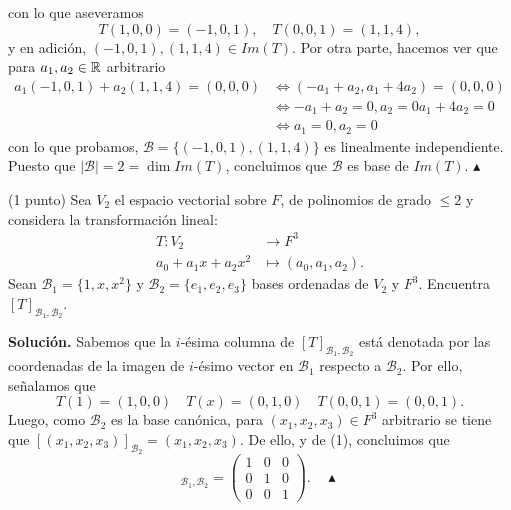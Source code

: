 \documentclass[11pt]{scrartcl}
\begin{document}
con lo que aseveramos
\begin{equation*}
    T(1,0,0)=(-1,0,1), \quad T(0,0,1)=(1,1,4),
\end{equation*}
y en adición, $(-1,0,1),(1,1,4) \in Im(T)$. Por otra parte, hacemos ver que para $a_1,a_2 \in \mathbb R$ arbitrario
\begin{align*}
    a_1(-1,0,1) + a_2(1,1,4) = (0,0,0) &\iff (-a_1+a_2,a_1+4a_2) = (0,0,0) \\
    &\iff -a_1+a_2=0, a_2=0 a_1+4a_2=0 \\
    &\iff a_1=0, a_2=0
\end{align*}
con lo que probamos, $\mathcal{B}=\{(-1,0,1),(1,1,4)\}$ es linealmente independiente. Puesto que $|\mathcal{B}|=2=\dim Im(T)$,
concluimos que $\mathcal{B}$ es base de $Im(T)$. $\blacktriangle$

\newpage
\begin{mdframed}[style=mdpurplebox, frametitle={Ejercicio 2, Tarea 11, Álgebra Lineal I}]
    (1 punto) Sea $V_2$ el espacio vectorial sobre $F$, de polinomios de grado $\leq 2$ y considera la transformación lineal:
    \begin{align*}
        T:V_2 &\rightarrow F^3 \\
        a_0+a_1x+a_2x^2 &\mapsto (a_0,a_1,a_2).
    \end{align*}
    Sean $\mathcal{B}_1 = \{1,x,x^2\}$ y $\mathcal{B}_2 = \{e_1,e_2,e_3\}$ bases ordenadas de $V_2$ y $F^3$. Encuentra $[T]_{\mathcal{B}_1,\mathcal{B}_2}$.
\end{mdframed}
\textbf{Solución.} Sabemos que la $i$-ésima columna de $[T]_{\mathcal{B}_1,\mathcal{B}_2}$ está denotada por las coordenadas de la imagen de $i$-ésimo
vector en $\mathcal{B}_1$ respecto a $\mathcal{B}_2$. Por ello, señalamos que
\begin{equation*}
    T(1)=(1,0,0) \quad T(x)=(0,1,0) \quad T(0,0,1)=(0,0,1). \tag{1}
\end{equation*}
Luego, como $\mathcal{B}_2$ es la base canónica, para $(x_1,x_2,x_3) \in F^3$ arbitrario se tiene que $[(x_1,x_2,x_3)]_{\mathcal{B}_2}=(x_1,x_2,x_3)$. De ello,
 y de (1), concluimos que
\begin{equation*}
    [T]_{\mathcal{B}_1,\mathcal{B}_2} =
    \begin{pmatrix}
        1 & 0 & 0 \\
        0 & 1 & 0 \\
        0 & 0 & 1
    \end{pmatrix}. \quad \blacktriangle
\end{equation*}
\end{document}
